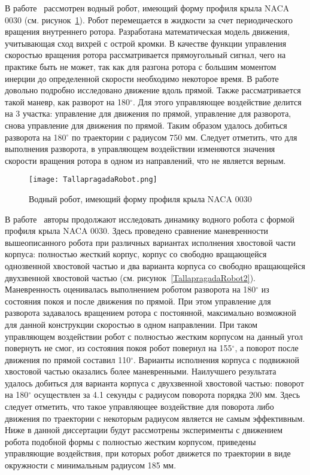 В работе~\cite{Pollard_Tallapragada_2016} рассмотрен водный робот, имеющий форму профиля крыла NACA 0030 (см. рисунок~\ref{TallapragadaRobot}). Робот перемещается в жидкости за счет периодического вращения внутреннего ротора. Разработана математическая модель движения, учитывающая сход вихрей с острой кромки. В качестве функции управления скоростью вращения ротора рассматривается прямоугольный сигнал, чего на практике быть не может, так как для разгона ротора с большим моментом инерции до определенной скорости необходимо некоторое время. В работе довольно подробно исследовано движение вдоль прямой. Также рассматривается такой маневр, как разворот на 180$^\circ$. Для этого управляющее воздействие делится на 3 участка: управление для движения по прямой, управление для разворота, снова управление для движения по прямой. Таким образом удалось добиться разворота на 180$^\circ$ по траектории с радиусом 750 мм. Следует отметить, что для выполнения разворота, в управляющем воздействии изменяются значения скорости вращения ротора в одном из направлений, что не является верным.

\begin{figure}[h]
	\centering
	\texttt{[image: TallapragadaRobot.png]}%
	\caption{Водный робот, имеющий форму профиля крыла NACA 0030}
	\label{TallapragadaRobot}
\end{figure}

В работе~\cite{Pollard_Tallapragada_2019} авторы продолжают исследовать динамику водного робота с формой профиля крыла NACA 0030. Здесь проведено сравнение маневренности вышеописанного робота при различных вариантах исполнения хвостовой части корпуса: полностью жесткий корпус, корпус со свободно вращающейся однозвенной хвостовой частью и два варианта корпуса со свободно вращающейся двухзвенной хвостовой частью (см. рисунок~\ref{TallapragadaRobot2}). Маневренность оценивалась выполнением роботом разворота на 180$^\circ$ из состояния покоя и после движения по прямой. При этом управление для разворота задавалось вращением ротора с постоянной, максимально возможной для данной конструкции скоростью в одном направлении. При таком управляющем воздействии робот с полностью жестким корпусом на данный угол повернуть не смог, из состояния покоя робот повернул на 155$^\circ$, а поворот после движения по прямой составил 110$^\circ$. Варианты исполнения корпуса с подвижной хвостовой частью оказались более маневренными. Наилучшего результата удалось добиться для варианта корпуса с двухзвенной хвостовой частью: поворот на 180$^\circ$ осуществлен за 4.1 секунды с радиусом поворота порядка 200 мм. Здесь следует отметить, что такое управляющее воздействие для поворота либо движения по траектории с некоторым радиусом является не самым эффективным. Ниже в данной диссертации будут рассмотрены эксперименты с движением робота подобной формы с полностью жестким корпусом, приведены управляющие воздействия, при которых робот движется по траектории в виде окружности с минимальным радиусом 185 мм.

